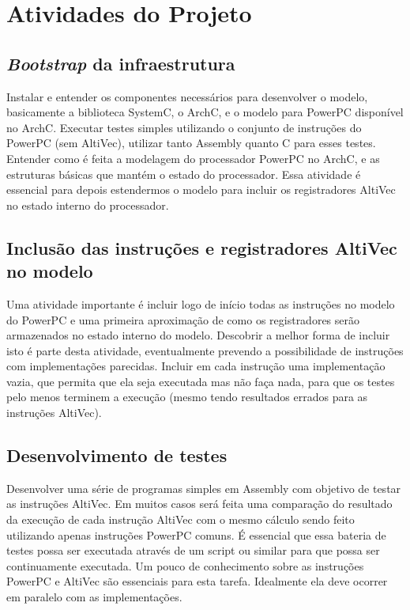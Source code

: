 \documentclass[twocolumn]{article}
\begin{document}
\section{Atividades do Projeto}

\subsection{\emph{Bootstrap} da infraestrutura}

Instalar e entender os componentes necessários para desenvolver o modelo,
basicamente a biblioteca SystemC, o ArchC, e o modelo para PowerPC disponível
no ArchC. Executar testes simples utilizando o conjunto de instruções do
PowerPC (sem AltiVec), utilizar tanto Assembly quanto C para esses testes.
Entender como é feita a modelagem do processador PowerPC no ArchC, e as
estruturas básicas que mantém o estado do processador.  Essa atividade é
essencial para depois estendermos o modelo para incluir os registradores
AltiVec no estado interno do processador.


\subsection{Inclusão das instruções e registradores AltiVec no modelo}

Uma atividade importante é incluir logo de início todas as instruções no modelo
do PowerPC e uma primeira aproximação de como os registradores serão
armazenados no estado interno do modelo. Descobrir a melhor forma de incluir
isto é parte desta atividade, eventualmente prevendo a possibilidade de
instruções com implementações parecidas. Incluir em cada instrução uma
implementação vazia, que permita que ela seja executada mas não faça nada, para
que os testes pelo menos terminem a execução (mesmo tendo resultados errados
para as instruções AltiVec).


\subsection{Desenvolvimento de testes}

Desenvolver uma série de programas simples em Assembly com objetivo de testar
as instruções AltiVec. Em muitos casos será feita uma comparação do resultado
da execução de cada instrução AltiVec com o mesmo cálculo sendo feito
utilizando apenas instruções PowerPC comuns. É essencial que essa bateria de
testes possa ser executada através de um script ou similar para que possa ser
continuamente executada. Um pouco de conhecimento sobre as instruções PowerPC e
AltiVec são essenciais para esta tarefa. Idealmente ela deve ocorrer em
paralelo com as implementações.
\end{document}

